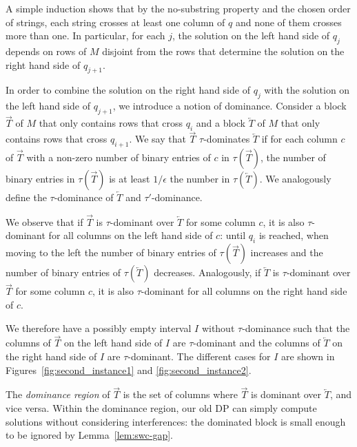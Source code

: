     A simple induction shows that by the no-substring property and the chosen order of strings, each string crosses at least one column of $q$ and none of them crosses more than one.
    In particular, for each $j$, the solution on the left hand side of $q_j$ depends on rows of $M$ disjoint from the rows that determine the solution on the right hand side of $q_{j+1}$. 
 
    In order to combine the solution on the right hand side of $q_j$ with the solution on the left hand side of $q_{j+1}$, we introduce a notion of dominance.
    Consider a block $\overrightarrow{T}$ of $M$ that only contains rows that cross $q_i$ and a block $\overleftarrow{T}$ of $M$ that only contains rows that cross $q_{i+1}$.
    We say that $\overrightarrow{T}$ $\tau$-dominates $\overleftarrow{T}$ if for each column $c$ of $\overrightarrow{T}$ with a non-zero number of binary entries of $c$ in $\tau(\overrightarrow{T})$,
    the number of binary entries in $\tau(\overrightarrow{T})$ is at least $1/\epsilon$ the number in $\tau(\overleftarrow{T})$.
    We analogously define the $\tau$-dominance of $\overleftarrow{T}$ and $\tau'$-dominance.
 
    We observe that if $\overrightarrow{T}$ is $\tau$-dominant over $\overleftarrow{T}$ for some column $c$, it is also $\tau$-dominant for all columns on the left hand side of $c$:
    until $q_i$ is reached, when moving to the left the number of binary entries of $\tau(\overrightarrow{T})$ increases and the number of binary entries of $\tau(\overleftarrow{T})$ decreases.
    Analogously, if $\overleftarrow{T}$ is $\tau$-dominant over $\overrightarrow{T}$ for some column $c$, it is also $\tau$-dominant for all columns on the right hand side of $c$.
 
    We therefore have a possibly empty interval $I$ without $\tau$-dominance such that the columns of $\overrightarrow{T}$ on the left hand side of $I$ are $\tau$-dominant and the columns of $\overleftarrow{T}$ on the right hand side of $I$ are $\tau$-dominant.
    The different cases for $I$ are shown in Figures~\ref{fig:second_instance1} and \ref{fig:second_instance2}.

    The \emph{dominance region} of $\overrightarrow{T}$ is the set of columns where $\overrightarrow{T}$ is dominant over $\overleftarrow{T}$, and vice versa.  
    Within the dominance region, our old DP can simply compute solutions without considering interferences: the dominated block is small enough to be ignored by Lemma~\ref{lem:swc-gap}.
   
